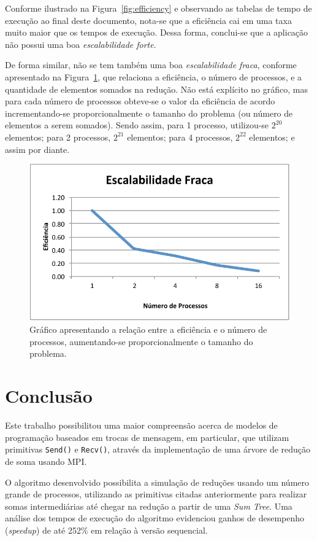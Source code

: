 \documentclass[12pt,a4paper]{article}
\begin{document}
Conforme ilustrado na Figura~\ref{fig:efficiency} e observando as tabelas de
tempo de execução ao final deste documento, nota-se que a eficiência cai em uma
taxa muito maior que os tempos de execução. Dessa forma, conclui-se que a
aplicação não possui uma boa \emph{escalabilidade forte}.

De forma similar, não se tem também uma boa \emph{escalabilidade fraca},
conforme apresentado na Figura~\ref{fig:weak-scalability}, que relaciona a
eficiência, o número de processos, e a quantidade de elementos somados na
redução. Não está explícito no gráfico, mas para cada número de processos
obteve-se o valor da eficiência de acordo incrementando-se proporcionalmente o
tamanho do problema (ou número de elementos a serem somados). Sendo assim, para
1 processo, utilizou-se $2^20$ elementos; para 2 processos, $2^21$ elementos;
para 4 processos, $2^22$ elementos; e assim por diante.

\begin{figure}[h!]
\centering
\includegraphics{img/weak-scalability.pdf}
\caption{Gráfico apresentando a relação entre a eficiência e o número de
processos, aumentando-se proporcionalmente o tamanho do problema.}
\label{fig:weak-scalability}
\end{figure}


\section{Conclusão}
Este trabalho possibilitou uma maior compreensão acerca de modelos de
programação baseados em trocas de mensagem, em particular, que utilizam
primitivas \texttt{Send()} e \texttt{Recv()}, através da implementação de uma
árvore de redução de soma usando MPI\@.

O algoritmo desenvolvido possibilita a simulação de reduções usando um número
grande de processos, utilizando as primitivas citadas anteriormente para
realizar somas intermediárias até chegar na redução a partir de uma \emph{Sum
Tree}. Uma análise dos tempos de execução do algoritmo evidenciou ganhos de
desempenho (\textit{speedup}) de até 252\% em relação à versão sequencial.
\end{document}
